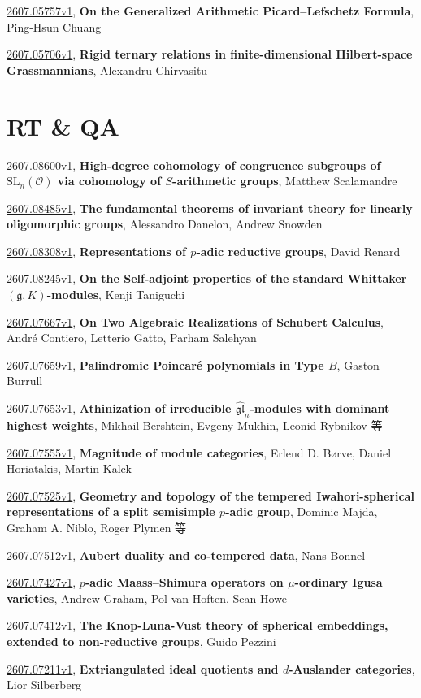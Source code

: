 \documentclass[9pt, a4paper]{article}
\theoremstyle{plain}
\theoremstyle{definition}
\theoremstyle{remark}
\newcommand{\arxiv}[3]{\href{https://arxiv.org/abs/#1}{#1}, \textbf{\textcolor{arxivblue}{#2}}, #3}
\begin{document}
\arxiv{2607.05757v1}{On the Generalized Arithmetic Picard--Lefschetz Formula}{Ping-Hsun Chuang}

\arxiv{2607.05706v1}{Rigid ternary relations in finite-dimensional Hilbert-space Grassmannians}{Alexandru Chirvasitu}


\section{RT \& QA}
\arxiv{2607.08600v1}{High-degree cohomology of congruence subgroups of $\text{SL}_n(\mathcal{O})$ via cohomology of $S$-arithmetic groups}{Matthew Scalamandre}

\arxiv{2607.08485v1}{The fundamental theorems of invariant theory for linearly oligomorphic groups}{Alessandro Danelon, Andrew Snowden}

\arxiv{2607.08308v1}{Representations of $p$-adic reductive groups}{David Renard}

\arxiv{2607.08245v1}{On the Self-adjoint properties of the standard Whittaker $(\mathfrak{g}, K)$-modules}{Kenji Taniguchi}

\arxiv{2607.07667v1}{On Two Algebraic Realizations of Schubert Calculus}{André Contiero, Letterio Gatto, Parham Salehyan}

\arxiv{2607.07659v1}{Palindromic Poincaré polynomials in Type $B$}{Gaston Burrull}

\arxiv{2607.07653v1}{Athinization of irreducible $\widehat{\mathfrak{gl}}_n$-modules with dominant highest weights}{Mikhail Bershtein, Evgeny Mukhin, Leonid Rybnikov 等}

\arxiv{2607.07555v1}{Magnitude of module categories}{Erlend D. Børve, Daniel Horiatakis, Martin Kalck}

\arxiv{2607.07525v1}{Geometry and topology of the tempered Iwahori-spherical representations of a split semisimple $p$-adic group}{Dominic Majda, Graham A. Niblo, Roger Plymen 等}

\arxiv{2607.07512v1}{Aubert duality and co-tempered data}{Nans Bonnel}

\arxiv{2607.07427v1}{$p$-adic Maass--Shimura operators on $μ$-ordinary Igusa varieties}{Andrew Graham, Pol van Hoften, Sean Howe}

\arxiv{2607.07412v1}{The Knop-Luna-Vust theory of spherical embeddings, extended to non-reductive groups}{Guido Pezzini}

\arxiv{2607.07211v1}{Extriangulated ideal quotients and $d$-Auslander categories}{Lior Silberberg}
\end{document}
